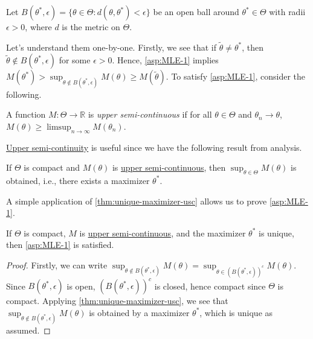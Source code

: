 \begin{notation}
	Let \(B(\theta ^{\ast} , \epsilon ) = \{ \theta \in \Theta \colon d(\theta , \theta ^{\ast} ) < \epsilon \} \) be an open ball around \(\theta ^{\ast} \in \Theta \) with radii \(\epsilon > 0\), where \(d\) is the metric on \(\Theta \).
\end{notation}

Let's understand them one-by-one. Firstly, we see that if \(\widetilde{\theta} \neq \theta ^{\ast} \), then \(\widetilde{\theta} \notin B(\theta ^{\ast} , \epsilon )\) for some \(\epsilon > 0\). Hence, \autoref{asp:MLE-1} implies \(M(\theta ^{\ast} ) > \sup _{\theta \notin B(\theta ^{\ast} , \epsilon )} M(\theta ) \geq M(\widetilde{\theta} )\). To satisfy \autoref{asp:MLE-1}, consider the following.

\begin{definition}\label{def:upper-semi-continuous}
	A function \(M\colon \Theta \to \mathbb{R} \) is \emph{upper semi-continuous} if for all \(\theta \in \Theta \) and \(\theta _n \to \theta \), \(M(\theta ) \geq \limsup_{n \to \infty} M(\theta _n)\).
\end{definition}

\hyperref[def:upper-semi-continuous]{Upper semi-continuity} is useful since we have the following result from analysis.

\begin{theorem}\label{thm:unique-maximizer-usc}
	If \(\Theta \) is compact and \(M(\theta )\) is \hyperref[def:upper-semi-continuous]{upper semi-continuous}, then \(\sup _{\theta \in \Theta } M(\theta )\) is obtained, i.e., there exists a maximizer \(\theta ^{\ast} \).
\end{theorem}

A simple application of \autoref{thm:unique-maximizer-usc} allows us to prove \autoref{asp:MLE-1}.

\begin{corollary}\label{col:asp:MLE-1}
	If \(\Theta \) is compact, \(M\) is \hyperref[def:upper-semi-continuous]{upper semi-continuous}, and the maximizer \(\theta ^{\ast} \) is unique, then \autoref{asp:MLE-1} is satisfied.
\end{corollary}
\begin{proof}
	Firstly, we can write \(\sup _{\theta \notin B(\theta ^{\ast} , \epsilon )} M(\theta ) = \sup _{\theta \in (B(\theta ^{\ast} , \epsilon ))^{c} } M(\theta ) \). Since \(B(\theta ^{\ast} , \epsilon )\) is open, \((B(\theta ^{\ast} , \epsilon ))^{c} \) is closed, hence compact since \(\Theta \) is compact. Applying \autoref{thm:unique-maximizer-usc}, we see that \(\sup _{\theta \notin B(\theta ^{\ast} , \epsilon )} M(\theta )\) is obtained by a maximizer \(\theta ^{\ast} \), which is unique as assumed.
\end{proof}

